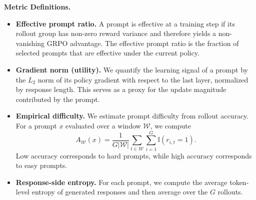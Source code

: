 \textbf{Metric Definitions.}
\begin{itemize}
    \item \textbf{Effective prompt ratio.} A prompt is effective at a training step if its rollout group has non-zero reward variance and therefore yields a non-vanishing GRPO advantage. The effective prompt ratio is the fraction of selected prompts that are effective under the current policy.
    \item \textbf{Gradient norm (utility).} We quantify the learning signal of a prompt by the $L_2$ norm of its policy gradient with respect to the last layer, normalized by response length. This serves as a proxy for the update magnitude contributed by the prompt.
    \item \textbf{Empirical difficulty.} We estimate prompt difficulty from rollout accuracy. For a prompt $x$ evaluated over a window $\mathcal{W}$, we compute
    \begin{equation}
        A_{\mathcal{W}}(x)=\frac{1}{G|\mathcal{W}|}\sum_{t\in\mathcal{W}}\sum_{i=1}^{G}\mathbb{I}(r_{i,t}=1).
    \end{equation}
    Low accuracy corresponds to hard prompts, while high accuracy corresponds to easy prompts.
    \item \textbf{Response-side entropy.} For each prompt, we compute the average token-level entropy of generated responses and then average over the $G$ rollouts.
\end{itemize}


